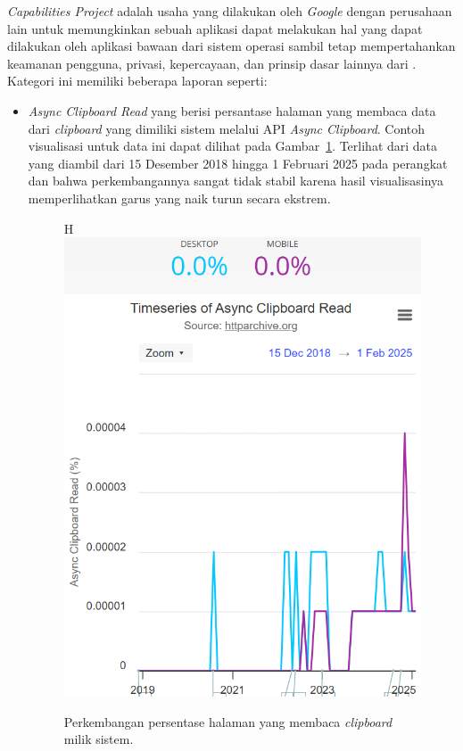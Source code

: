 \textit{Capabilities Project} adalah usaha yang dilakukan oleh \textit{Google} dengan perusahaan lain untuk memungkinkan sebuah aplikasi \web dapat melakukan hal yang dapat dilakukan oleh aplikasi bawaan dari sistem operasi sambil tetap mempertahankan keamanan pengguna, privasi, kepercayaan, dan prinsip dasar lainnya dari \web. Kategori ini memiliki beberapa laporan seperti:
\begin{itemize}
    \item \textit{Async Clipboard Read} yang berisi persantase halaman yang membaca data dari \textit{clipboard} yang dimiliki sistem melalui API \textit{Async Clipboard}. Contoh visualisasi untuk data ini dapat dilihat pada Gambar~\ref{fig:async}. Terlihat dari data yang diambil dari 15 Desember 2018 hingga 1 Februari 2025 pada perangkat \desktop dan \mobile bahwa perkembangannya sangat tidak stabil karena hasil visualisasinya memperlihatkan garus yang naik turun secara ekstrem.
    \begin{figure}{H}
        \centering
        \includegraphics[width=0.4\linewidth]{Gambar/Contoh Async.png}
        \caption{Perkembangan persentase halaman \web yang membaca \textit{clipboard} milik sistem.}
        \label{fig:async}
    \end{figure}
    


\end{itemize}
